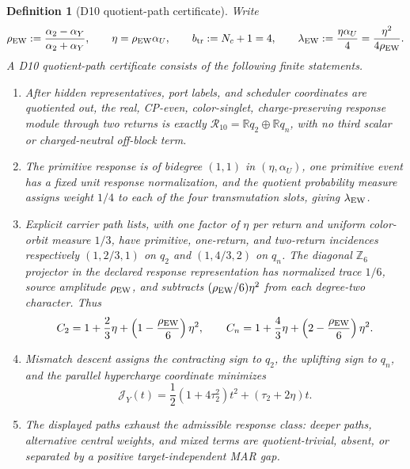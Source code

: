 \documentclass[11pt]{article}
\newtheorem{definition}[theorem]{Definition}
\begin{document}
\begin{definition}[D10 quotient-path certificate]\label{def:d10-quotient-path-certificate}
Write
\[
\rho_{\rm EW}:=\frac{\alpha_2-\alpha_Y}{\alpha_2+\alpha_Y},
\qquad
\eta=\rho_{\rm EW}\alpha_U,
\qquad
b_{\rm tr}:=N_c+1=4,
\qquad
\lambda_{\rm EW}:=\frac{\eta\alpha_U}{4}
=\frac{\eta^2}{4\rho_{\rm EW}}.
\]
A D10 quotient-path certificate consists of the following finite statements.
\begin{enumerate}[leftmargin=2em,label=\textup{QT\arabic*.}]
\item After hidden representatives, port labels, and scheduler coordinates
are quotiented out, the real, CP-even, color-singlet, charge-preserving
response module through two returns is exactly
\(\mathcal R_{10}=\mathbb R q_2\oplus\mathbb R q_n\), with no third scalar or
charged-neutral off-block term.
\item The primitive response is of bidegree \((1,1)\) in
\((\eta,\alpha_U)\), one primitive event has a fixed unit response
normalization, and the quotient probability measure assigns weight \(1/4\) to
each of the four transmutation slots, giving \(\lambda_{\rm EW}\).
\item Explicit carrier path lists, with one factor of \(\eta\) per return and
uniform color-orbit measure \(1/3\), have primitive, one-return, and two-return incidences respectively
\((1,2/3,1)\) on \(q_2\) and \((1,4/3,2)\) on \(q_n\).  The diagonal
\(\mathbb Z_6\) projector in the declared response representation has
normalized trace \(1/6\), source amplitude \(\rho_{\rm EW}\), and subtracts
\((\rho_{\rm EW}/6)\eta^2\) from each degree-two character.  Thus
\[
C_2=1+\frac23\eta+\left(1-\frac{\rho_{\rm EW}}{6}\right)\eta^2,
\qquad
C_n=1+\frac43\eta+\left(2-\frac{\rho_{\rm EW}}{6}\right)\eta^2.
\]
\item Mismatch descent assigns the contracting sign to \(q_2\), the uplifting
sign to \(q_n\), and the parallel hypercharge coordinate minimizes
\[
\mathcal J_Y(t)
=\frac12(1+4\tau_2^2)t^2+(\tau_2+2\eta)t.
\]
\item The displayed paths exhaust the admissible response class: deeper
paths, alternative central weights, and mixed terms are quotient-trivial,
absent, or separated by a positive target-independent MAR gap.
\end{enumerate}
\end{definition}
\end{document}
